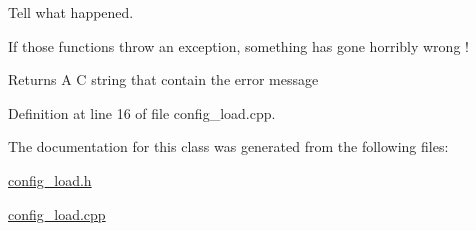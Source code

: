 Tell what happened. 

If those functions throw an exception, something has gone horribly wrong !

\begin{DoxyReturn}{Returns}
A C string that contain the error message 
\end{DoxyReturn}


Definition at line 16 of file config\+\_\+load.\+cpp.



The documentation for this class was generated from the following files\+:\begin{DoxyCompactItemize}
\item 
\hyperlink{config__load_8h}{config\+\_\+load.\+h}\item 
\hyperlink{config__load_8cpp}{config\+\_\+load.\+cpp}\end{DoxyCompactItemize}
